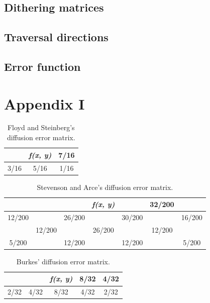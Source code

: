 \documentclass[conference]{IEEEtran}
\begin{document}
\subsection{Dithering matrices}

\subsection{Traversal directions}

\subsection{Error function}

\section{Appendix I}
\label{sec:appendix1}

\begin{table}[!h]
\centering
\renewcommand{\arraystretch}{1.5}
\begin{tabular}{c|c|c}
     & \textit{f(x, y)} & 7/16 \\ \hline
3/16 & 5/16             & 1/16
\end{tabular}
\caption{Floyd and Steinberg's diffusion error matrix.}
\label{tab:flo}
\end{table}

\begin{table}[!h]
\centering
\renewcommand{\arraystretch}{1.5}
\begin{tabular}{c|c|c|c|c|c|c}
 & \textit{} &  & \textit{f(x, y)} &  & 32/200 &  \\ \hline
12/200 &  & 26/200 &  & 30/200 &  & 16/200 \\ \hline
 & 12/200 &  & 26/200 &  & 12/200 &  \\ \hline
5/200 &  & 12/200 &  & 12/200 &  & 5/200
\end{tabular}
\caption{Stevenson and Arce's diffusion error matrix.}
\label{tab:ste}
\end{table}

\begin{table}[!h]
\centering
\renewcommand{\arraystretch}{1.5}
\begin{tabular}{c|c|c|c|c}
 &  & \textit{f(x, y)} & 8/32 & 4/32 \\ \hline
2/32 & 4/32 & 8/32 & 4/32 & 2/32
\end{tabular}
\caption{Burkes' diffusion error matrix.}
\label{tab:bur}
\end{table}
\end{document}
